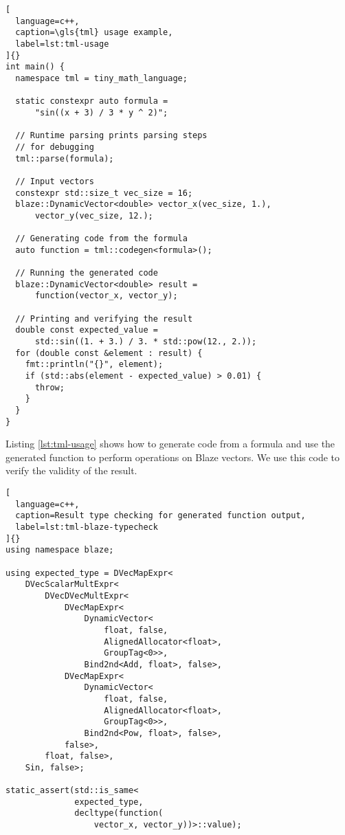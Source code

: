 \documentclass[../main]{subfiles}
\begin{document}
\begin{lstlisting}[
  language=c++,
  caption=\gls{tml} usage example,
  label=lst:tml-usage
]{}
int main() {
  namespace tml = tiny_math_language;

  static constexpr auto formula =
      "sin((x + 3) / 3 * y ^ 2)";

  // Runtime parsing prints parsing steps
  // for debugging
  tml::parse(formula);

  // Input vectors
  constexpr std::size_t vec_size = 16;
  blaze::DynamicVector<double> vector_x(vec_size, 1.),
      vector_y(vec_size, 12.);

  // Generating code from the formula
  auto function = tml::codegen<formula>();

  // Running the generated code
  blaze::DynamicVector<double> result =
      function(vector_x, vector_y);

  // Printing and verifying the result
  double const expected_value =
      std::sin((1. + 3.) / 3. * std::pow(12., 2.));
  for (double const &element : result) {
    fmt::println("{}", element);
    if (std::abs(element - expected_value) > 0.01) {
      throw;
    }
  }
}
\end{lstlisting}

Listing \ref{lst:tml-usage} shows how to generate code from a formula
and use the generated function to perform operations on Blaze vectors.
We use this code to verify the validity of the result.

\begin{lstlisting}[
  language=c++,
  caption=Result type checking for generated function output,
  label=lst:tml-blaze-typecheck
]{}
using namespace blaze;

using expected_type = DVecMapExpr<
    DVecScalarMultExpr<
        DVecDVecMultExpr<
            DVecMapExpr<
                DynamicVector<
                    float, false,
                    AlignedAllocator<float>,
                    GroupTag<0>>,
                Bind2nd<Add, float>, false>,
            DVecMapExpr<
                DynamicVector<
                    float, false,
                    AlignedAllocator<float>,
                    GroupTag<0>>,
                Bind2nd<Pow, float>, false>,
            false>,
        float, false>,
    Sin, false>;

static_assert(std::is_same<
              expected_type,
              decltype(function(
                  vector_x, vector_y))>::value);
\end{lstlisting}
\end{document}
